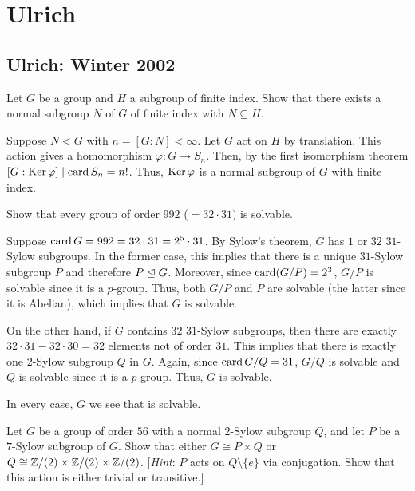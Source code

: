 \section{Ulrich}
\subsection{Ulrich: Winter 2002}
\setcounter{exercise}{0}
\setcounter{equation}{0}

\begin{problem}
  Let \(G\) be a group and \(H\) a subgroup of finite index. Show that
  there exists a normal subgroup \(N\) of \(G\) of finite index with
  \(N\subseteq H\).
\end{problem}
\begin{solution}
  Suppose \(N<G\) with \(n=[G:N]<\infty\). Let \(G\) act on \(H\) by
  translation. This action gives a homomorphism \(\varphi\colon G\to
  S_n\). Then, by the first isomorphism theorem
  \([G:{\operatorname{Ker}\varphi}]\mid \operatorname{card} S_n=n!\). Thus, \(\operatorname{Ker}\varphi\) is a normal
  subgroup of \(G\) with finite index.
\end{solution}

\begin{problem}
  Show that every group of order \(992\) (\(=32\cdot 31)\) is solvable.
\end{problem}
\begin{solution}
  Suppose \(\operatorname{card} G=992=32\cdot 31=2^5\cdot 31\). By Sylow's theorem, \(G\)
  has \(1\) or \(32\) \(31\)-Sylow subgroups. In the former case, this
  implies that there is a unique \(31\)-Sylow subgroup \(P\) and therefore
  \(P\trianglelefteq G\). Moreover, since \(\operatorname{card}(G/P)=2^3\), \(G/P\) is solvable
  since it is a \(p\)-group. Thus, both \(G/P\) and \(P\) are solvable
  (the latter since it is Abelian), which implies that \(G\) is solvable.

  On the other hand, if \(G\) contains \(32\) \(31\)-Sylow subgroups, then
  there are exactly \(32\cdot 31-32\cdot 30=32\) elements not of order
  \(31\). This implies that there is exactly one \(2\)-Sylow subgroup \(Q\)
  in \(G\). Again, since \(\operatorname{card} G/Q=31\), \(G/Q\) is solvable and \(Q\) is
  solvable since it is a \(p\)-group. Thus, \(G\) is solvable.

  In every case, \(G\) we see that is solvable.
\end{solution}

\begin{problem}
  Let \(G\) be a group of order \(56\) with a normal \(2\)-Sylow subgroup
  \(Q\), and let \(P\) be a \(7\)-Sylow subgroup of \(G\). Show that either
  \(G\cong P\times Q\) or \(Q\cong\mathbb{Z}/(2)\times\mathbb{Z}/(2)\times\mathbb{Z}/(2)\).
  [\emph{Hint}: \(P\) acts on \(Q\setminus\{e\}\) via conjugation. Show
  that this action is either trivial or transitive.]
\end{problem}
\begin{solution}
\end{solution}

